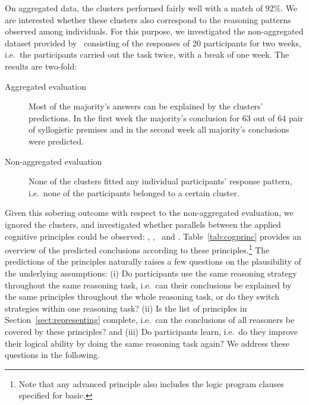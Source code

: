 \documentclass[12pt]{article}
\begin{document}
On aggregated data, the clusters performed fairly well with a match of 92\;\%. 
We are interested whether these clusters also correspond to the reasoning patterns observed among individuals. 
For this purpose, we investigated the non-aggregated dataset provided by~\cite{khemlani:2016} consisting of the responses of 20 participants for two weeks,
i.e.\ the participants carried out the task twice, with a break of one week. 
The results are two-fold:
\begin{description}
 \item[Aggregated evaluation] Most of the majority's answers can be explained by the clusters' predictions. In the first week 
 the majority's conclusion for 63 out of 64 pair of syllogistic premises and in the second week
 all majority's conclusions were predicted.
\item[Non-aggregated evaluation] None of the clusters fitted any individual participants' response pattern, i.e.\ none of the participants belonged to a certain cluster.
\end{description}



Given this sobering outcome with respect to the non-aggregated evaluation, 
we ignored the clusters, and investigated whether parallels between the applied cognitive principles could be observed: \basic, \contraposition, \abduction\ and \negFailure.
Table~\ref{tab:cogprinc} provides an overview of the predicted conclusions according to these principles.\footnote{Note that any advanced principle also includes the logic program clauses specified for \textsf{basic}.}
The predictions of the principles naturally raises a few questions on the plausibility of 
the underlying assumptions:
(i) Do participants use the same reasoning strategy throughout the same reasoning task, i.e.\ 
can their conclusions be 
explained by  the same principles throughout the whole reasoning task, or do they switch strategies within one reasoning task?
(ii) Is the list of principles in Section~\ref{sect:representing} complete, i.e.\ can the conclusions of all reasoners be covered
 by these principles? and
(iii) Do participants learn, i.e.\ do they improve their logical ability by doing the same reasoning task again?
We address these questions in the following.
\end{document}
